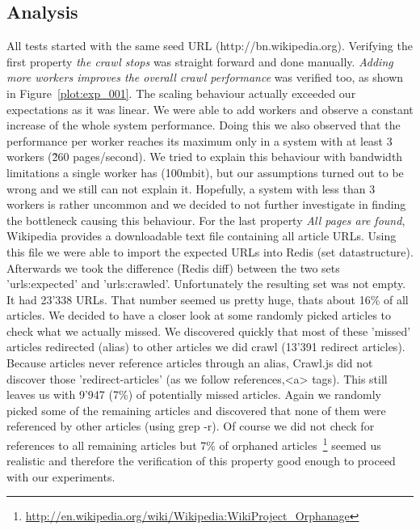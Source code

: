 \subsection{Analysis}

All tests started with the same seed URL (http://bn.wikipedia.org). Verifying the first property \emph{the crawl stops} was straight forward and done manually. \emph{Adding more workers improves the overall crawl performance} was verified too, as shown in Figure~\ref{plot:exp_001}. The scaling behaviour actually exceeded our expectations as it was linear. We were able to add workers and observe a constant increase of the whole system performance. Doing this we also observed that the performance per worker reaches its maximum only in a system with at least 3 workers (\~260 pages/second). We tried to explain this behaviour with bandwidth limitations a single worker has (100mbit), but our assumptions turned out to be wrong and we still can not explain it. Hopefully, a system with less than 3 workers is rather uncommon and we decided to not further investigate in finding the bottleneck causing this behaviour.
\newline
\newline
For the last property \emph{All pages are found}, Wikipedia provides a downloadable text file containing all article URLs. Using this file we were able to import the expected URLs into Redis (set datastructure). Afterwards we took the difference (Redis diff) between the two sets 'urls:expected' and 'urls:crawled'. Unfortunately the resulting set was not empty. It had 23'338 URLs. That number seemed us pretty huge, thats about 16\% of all articles. We decided to have a closer look at some randomly picked articles to check what we actually missed. We discovered quickly that most of these 'missed' articles redirected (alias) to other articles we did crawl (13'391 redirect articles). Because articles never reference articles through an alias, Crawl.js did not discover those 'redirect-articles' (as we follow references,<a> tags). This still leaves us with 9'947 (7\%) of potentially missed articles. Again we randomly picked some of the remaining articles and discovered that none of them were referenced by other articles (using grep -r). Of course we did not check for references to all remaining articles but 7\% of orphaned articles~\footnote{\url{http://en.wikipedia.org/wiki/Wikipedia:WikiProject_Orphanage}} seemed us realistic and therefore the verification of this property good enough to proceed with our experiments.
\newline
